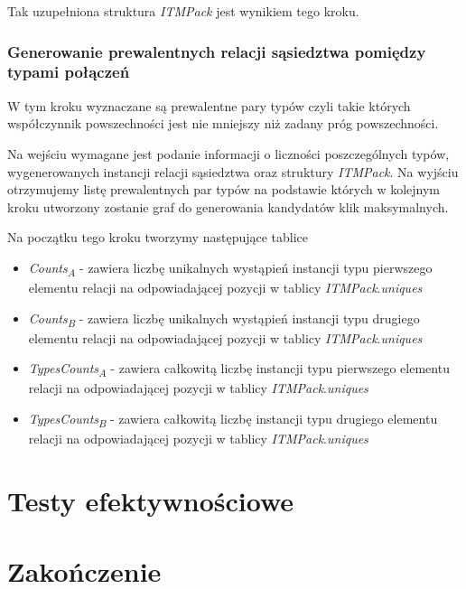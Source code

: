 \documentclass[12pt]{article}
\begin{document}
Tak uzupełniona struktura \textit{ITMPack} jest wynikiem tego kroku.


\subsubsection{Generowanie prewalentnych relacji sąsiedztwa pomiędzy typami połączeń}

W tym kroku wyznaczane są prewalentne pary typów czyli takie których współczynnik powszechności jest nie mniejszy niż zadany próg powszechności.

Na wejściu wymagane jest podanie informacji o liczności poszczególnych typów, wygenerowanych instancji relacji sąsiedztwa oraz struktury \textit{ITMPack}.
Na wyjściu otrzymujemy listę prewalentnych par typów na podstawie których w kolejnym kroku utworzony zostanie graf do generowania kandydatów klik maksymalnych.

Na początku tego kroku tworzymy następujące tablice
\begin{itemize}
	\item \textit{Counts\textsubscript{A}} - zawiera liczbę unikalnych wystąpień instancji typu pierwszego elementu relacji na odpowiadającej pozycji w tablicy \textit{ITMPack}.\textit{uniques}
	
	\item \textit{Counts\textsubscript{B}} - zawiera liczbę unikalnych wystąpień instancji typu drugiego elementu relacji na odpowiadającej pozycji w tablicy \textit{ITMPack}.\textit{uniques}
	
	\item \textit{TypesCounts\textsubscript{A}} - zawiera całkowitą liczbę instancji typu pierwszego elementu relacji na odpowiadającej pozycji w tablicy \textit{ITMPack}.\textit{uniques}
	
	\item \textit{TypesCounts\textsubscript{B}} - zawiera całkowitą liczbę instancji typu drugiego elementu relacji na odpowiadającej pozycji w tablicy \textit{ITMPack}.\textit{uniques}
\end{itemize}




\newpage
\section{Testy efektywnościowe}
\label{sec:tests}

\section{Zakończenie}
\label{sec:fin}
\end{document}
